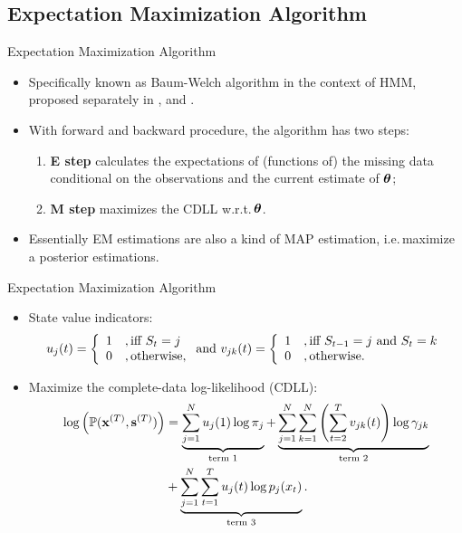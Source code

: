 
\subsection{Expectation Maximization Algorithm}

\begin{frame}[fragile]{Expectation Maximization Algorithm}
	\begin{itemize}\vspace{0.4mm}
	\item Specifically known as Baum-Welch algorithm in the context of HMM,
		proposed separately in \cite{Baum:1966cy},\cite{Baum:1967gs} and \cite{Baum:1970do}.
	\item With forward and backward procedure, the algorithm has two steps:
		\begin{enumerate}
		\item \textbf{E step} calculates the expectations of (functions of) the missing data 
		conditional on the observations and the current estimate of ${\boldsymbol\theta}$;
		\item \textbf{M step} maximizes the CDLL w.r.t.\,${\boldsymbol\theta}$.
		\end{enumerate}
	\item Essentially EM estimations are also a kind of \alert{MAP} estimation, 
		i.e.\,\alert{maximize a posterior} estimations.
	\end{itemize}
\end{frame}

\begin{frame}[fragile,t]{Expectation Maximization Algorithm}
	\begin{itemize}
	\item State value indicators:
		\[ u_j(t) = \left \{ \begin{array}{l l}
		1 & ,\text{iff}\ S_t = j \\
		0 & ,\text{otherwise}, \\
		\end{array} \right.
		\text{and}\ 
		v_{jk}(t) = \left \{ \begin{array}{l l}
		1 & ,\text{iff}\ S_{t-1} = j\ \text{and}\ S_t = k \\
		0 & ,\text{otherwise}. \\
		\end{array} \right. \]
	\item Maximize the complete-data log-likelihood (CDLL):
		\[ \begin{aligned}
		\log\left(\mathbb{P}({\mathbf x}^{(T)},{\mathbf s}^{(T)})\right) & = 
		\underbrace{\sum_{j=1}^{N} u_j(1)\log\pi_j}_{\text{term 1}} + 
		\underbrace{\sum_{j=1}^{N}\sum_{k=1}^{N} 
			\left(\sum_{t=2}^Tv_{jk}(t)\right)\log\gamma_{jk}}_{\text{term 2}} \\ 
		& + \underbrace{\sum_{j=1}^{N}\sum_{t=1}^{T} u_j(t)\log p_j(x_t)}_{\text{term 3}}. 
		\end{aligned} \]
	\end{itemize}
\end{frame}

